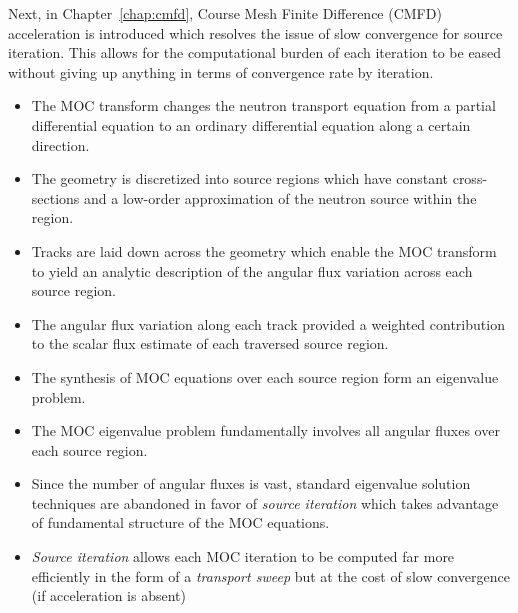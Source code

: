 Next, in Chapter~\ref{chap:cmfd}, Course Mesh Finite Difference (CMFD) acceleration is introduced which resolves the issue of slow convergence for source iteration. This allows for the computational burden of each iteration to be eased without giving up anything in terms of convergence rate by iteration.

\newpage
\vfill
\begin{highlightsbox}[frametitle=Highlights]
	\begin{itemize}
		\item The MOC transform changes the neutron transport equation from a partial differential equation to an ordinary differential equation along a certain direction.
		\item The geometry is discretized into source regions which have constant cross-sections and a low-order approximation of the neutron source within the region.
		\item Tracks are laid down across the geometry which enable the  MOC transform to yield an analytic description of the angular flux variation across each source region.
		\item The angular flux variation along each track provided a weighted contribution to the scalar flux estimate of each traversed source region.
		\item The synthesis of MOC equations over each source region form an eigenvalue problem.
		\item The MOC eigenvalue problem fundamentally involves all angular fluxes over each source region.
		\item Since the number of angular fluxes is vast, standard eigenvalue solution techniques are abandoned in favor of \textit{source iteration} which takes advantage of fundamental structure of the MOC equations.
		\item \textit{Source iteration} allows each MOC iteration to be computed far more efficiently in the form of a \textit{transport sweep} but at the cost of slow convergence (if acceleration is absent)
	\end{itemize}
\end{highlightsbox}